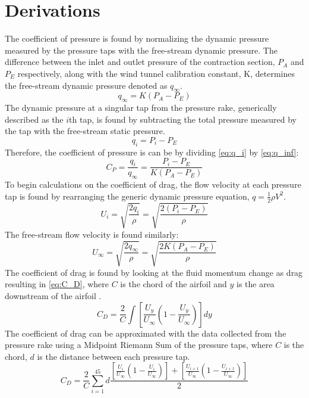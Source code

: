 \section{Derivations}
The coefficient of pressure is found by normalizing the dynamic pressure measured by the pressure taps with the free-stream dynamic pressure. The difference between the inlet and outlet pressure of the contraction section, $P_A$ and $P_E$ respectively, along with the wind tunnel calibration constant, K, determines the free-stream dynamic pressure denoted as $q_\infty$.
\begin{equation}\label{eq:q_inf}
    q_\infty = K (P_A - P_E)
\end{equation}
The dynamic pressure at a singular tap from the pressure rake, generically described as the $i$th tap, is found by subtracting the total pressure measured by the tap with the free-stream static pressure.
\begin{equation}\label{eq:q_i}
    q_i = P_i - P_E 
\end{equation}
Therefore, the coefficient of pressure is can be by dividing \autoref{eq:q_i} by \autoref{eq:q_inf}:
\begin{equation}\label{eq:C_P}
    C_P = \frac{q_i}{q_\infty} = \frac{P_i - P_E }{K (P_A - P_E)}
\end{equation}
To begin calculations on the coefficient of drag, the flow velocity at each pressure tap is found by rearranging the generic dynamic pressure equation, $q = \frac{1}{2}\rho V^2$.
\begin{equation}\label{eq:U_i}
    U_i = \sqrt{\frac{2 q_i}{\rho}} = \sqrt{\frac{2 (P_i - P_E)}{\rho}}
\end{equation}
The free-stream flow velocity is found similarly: 
\begin{equation}\label{eq:U_inf}
    U_\infty = \sqrt{\frac{2 q_\infty}{\rho}} = \sqrt{\frac{2 K (P_A - P_E)}{\rho}}
\end{equation}
The coefficient of drag is found by looking at the fluid momentum change as drag resulting in \autoref{eq:C_D}, where $C$ is the chord of the airfoil and $y$ is the area downstream of the airfoil \citep{lab6-manual}.
\begin{equation}\label{eq:C_D}
    C_D = \frac{2}{C} \int [\frac{U_y}{U_\infty}(1-\frac{U_y}{U_\infty})]dy
\end{equation}
The coefficient of drag can be approximated with the data collected from the pressure rake using a Midpoint Riemann Sum of the pressure taps, where $C$ is the chord, $d$ is the distance between each pressure tap.
\begin{equation}
    C_D = \frac{2}{C} \sum_{i=1}^{45} d\frac{[\frac{U_i}{U_\infty}(1-\frac{U_i}{U_\infty})] + [\frac{U_{i+1}}{U_\infty}(1-\frac{U_{i+1}}{U_\infty})]}{2}
\end{equation}

